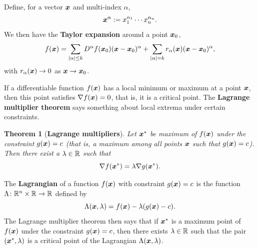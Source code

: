 \documentclass[11pt,a4paper]{memoir}
\newtheorem*{theorem*}{Theorem}
\begin{document}
Define, for a vector $\bm{x}$ and multi-index $\alpha$,
\begin{equation*}
 \bm{x}^{\alpha} := x_1^{\alpha_1}\cdots x_n^{\alpha_n}.
\end{equation*}
We then have the \textbf{Taylor expansion} around a point $\bm{x}_0$,
\begin{equation*}
 f(\bm{x}) = \sum_{|\alpha|\leq k} D^{\alpha}f(\bm{x}_0)(\bm{x}-\bm{x}_0)^{\alpha} + \sum_{|\alpha|=k} r_\alpha(\bm{x})(\bm{x}-\bm{x}_0)^{\alpha},
\end{equation*}
with $r_\alpha(\bm{x})\to 0$ as $\bm{x}\to \bm{x}_0$.

If a differentiable function $f(\bm{x})$ has a local minimum or maximum at a point $\bm{x}$, then this point satisfies $\nabla f(\bm{x})=0$,
that is, it is a critical point. 
The \textbf{Lagrange multiplier theorem} says something about local extrema under certain constraints.

\begin{theorem*}[\textbf{Lagrange multipliers}]
Let $\bm{x}^*$ be maximum of $f(\bm{x})$ under the constraint $g(\bm{x})=c$ (that is, a maximum among all points $\bm{x}$ such that $g(\bm{x})=c$). Then there exist a $\lambda\in \mathbb{R}$ 
such that
\begin{equation*}
  \nabla f(\bm{x}^*) = \lambda \nabla g(\bm{x}^*).
\end{equation*}
\end{theorem*}

The \textbf{Lagrangian} of a function $f(\bm{x})$ with constraint $g(\bm{x})=c$ is the function $\Lambda \colon \mathbb{R}^n\times \mathbb{R}\rightarrow \mathbb{R}$ defined by
\begin{equation*}
  \Lambda(\bm{x},\lambda) = f(\bm{x})-\lambda (g(\bm{x})-c).
\end{equation*}
The Lagrange multiplier theorem then says that if $\bm{x}^*$ is a maximum point of $f(\bm{x})$ under the constraint $g(\bm{x})=c$, then there exists $\lambda\in \mathbb{R}$ such that the pair $(\bm{x}^*,\lambda)$ is
a critical point of the Lagrangian $\Lambda(\bm{x},\lambda)$. 
\end{document}
